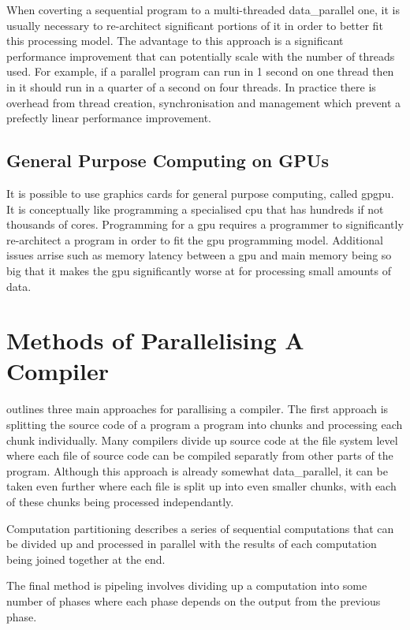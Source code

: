 When coverting a sequential program to a multi-threaded \gls{data_parallel}
one, it is usually necessary to re-architect significant portions of it in
order to better fit this processing model. The advantage to this approach is  a
significant performance improvement that can potentially scale with the number
of threads used. For example, if a parallel program can run in 1 second on
one thread then in it should run in a quarter of a second on four threads. In
practice there is overhead from thread creation, synchronisation and management
which prevent a prefectly linear performance improvement.

\subsection{General Purpose Computing on GPUs} \label{gpgpu}

It is possible to use graphics cards for general purpose computing, called
\gls{gpgpu}. It is conceptually like programming a specialised \gls{cpu} that
has hundreds if not thousands of cores. Programming for a \gls{gpu} requires a
programmer to significantly re-architect a program in order to fit the \gls{gpu}
programming model. Additional issues arrise such as memory latency between a
\gls{gpu} and main memory being so big that it makes the \gls{gpu} significantly
worse at for processing small amounts of data.

\section{Methods of Parallelising A Compiler} \label{compiler_parallel_methods}

\cite{gross_parallel_1989} outlines three main approaches for parallising a
compiler. The first approach is splitting the source code of a program a program
into chunks and processing each chunk individually. Many compilers divide up
source code at the file system level where each file of source code can be
compiled separatly from other parts of the program. Although this approach is
already somewhat \gls{data_parallel}, it can be taken even further where each
file is split up into even smaller chunks, with each of these chunks being
processed independantly.

Computation partitioning describes a series of sequential computations that can
be divided up and processed in parallel with the results of each computation
being joined together at the end.

The final method is pipeling involves dividing up a computation into some
number of phases where each phase depends on the output from the previous
phase. 

